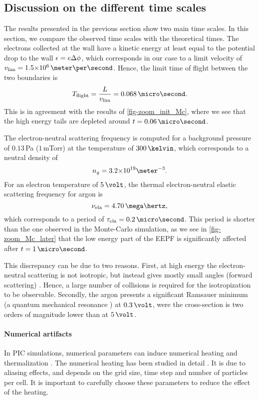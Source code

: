   \subsection{Discussion on the different time scales}
    The results presented in the previous section show two main time scales.
    In this section, we compare the observed time scales with the theoretical times.
    The electrons collected at the wall have a kinetic energy at least equal to the potential drop to the wall $\epsilon = e \Delta \phi$, which corresponds in our case to a limit velocity of $v_{\rm lim} = \sn{1.5}{6} \,\meter\per\second$.
    Hence, the limit time of flight between the two boundaries is
    \[ T_{\rm flight} = \frac{L}{v_{\rm lim}} = 0.068 \,\micro\second.  \]
    This is in agreement with the results of \cref{fig-zoom_init_Mc}, where we see that the high energy tails are depleted around $t=0.06\,\micro\second$.
    
    \vspace{1em}
    The electron-neutral scattering frequency is computed for a background pressure of $0.13$\,Pa (${1}$\,mTorr) at the temperature of $300\,\kelvin$, which corresponds to a neutral density of $${n_g = \sn{3.2}{19} \meter^{-3}}.$$
    For an electron temperature of $5\,\volt$, the thermal electron-neutral elastic scattering frequency for argon is \citep[p.73]{lieberman2005}
    \[ \nu_{\rm ela} = 4.70 \,\mega\hertz,  \] 
    which corresponds to a period of $\tau_{\rm ela} = 0.2 \,\micro\second$.
    This period is shorter than the one observed in the Monte-Carlo simulation, as we see in \cref{fig-zoom_Mc_later} that the low energy part of the EEPF is significantly affected after $t=1\,\micro\second$.
    
    This discrepancy can be due to two reasons.
    First, at high energy the electron-neutral scattering is not isotropic, but instead gives mostly small angles (forward scattering) \citep{vahedi1995}.
    Hence, a large number of collisions is required for the isotropization to be observable.
    Secondly, the argon presents a significant Ramsauer minimum (a quantum mechanical resonance \citep{lieberman2005}) at $0.3 \,\volt$, were the cross-section is two orders of magnitude lower than at $5\,\volt$.  
    
        \paragraph{Numerical artifacts \\}
        In PIC simulations, numerical parameters can induce numerical heating and thermalization \citep{lai2014}.
        The numerical heating has been studied in detail \citep{birdsall1991}.
        It is due to aliasing effects, and depends on the grid size, time step and number of particles per cell.
        It is important to carefully choose these parameters to reduce the effect of the heating.

